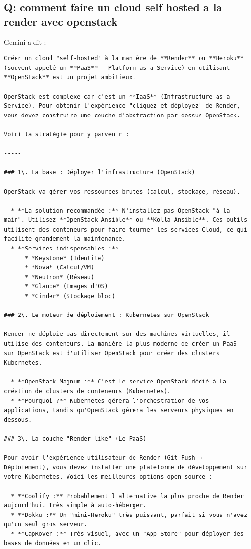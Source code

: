 \documentclass{report} %
\begin{document}
\subsection{Q: comment faire un cloud self hosted a la render avec openstack}
Gemini a dit :
\begin{verbatim}
Créer un cloud "self-hosted" à la manière de **Render** ou **Heroku** (souvent appelé un **PaaS** - Platform as a Service) en utilisant **OpenStack** est un projet ambitieux.

OpenStack est complexe car c'est un **IaaS** (Infrastructure as a Service). Pour obtenir l'expérience "cliquez et déployez" de Render, vous devez construire une couche d'abstraction par-dessus OpenStack.

Voici la stratégie pour y parvenir :

-----

### 1\. La base : Déployer l'infrastructure (OpenStack)

OpenStack va gérer vos ressources brutes (calcul, stockage, réseau).

  * **La solution recommandée :** N'installez pas OpenStack "à la main". Utilisez **OpenStack-Ansible** ou **Kolla-Ansible**. Ces outils utilisent des conteneurs pour faire tourner les services Cloud, ce qui facilite grandement la maintenance.
  * **Services indispensables :**
      * *Keystone* (Identité)
      * *Nova* (Calcul/VM)
      * *Neutron* (Réseau)
      * *Glance* (Images d'OS)
      * *Cinder* (Stockage bloc)

### 2\. Le moteur de déploiement : Kubernetes sur OpenStack

Render ne déploie pas directement sur des machines virtuelles, il utilise des conteneurs. La manière la plus moderne de créer un PaaS sur OpenStack est d'utiliser OpenStack pour créer des clusters Kubernetes.

  * **OpenStack Magnum :** C'est le service OpenStack dédié à la création de clusters de conteneurs (Kubernetes).
  * **Pourquoi ?** Kubernetes gérera l'orchestration de vos applications, tandis qu'OpenStack gérera les serveurs physiques en dessous.

### 3\. La couche "Render-like" (Le PaaS)

Pour avoir l'expérience utilisateur de Render (Git Push → Déploiement), vous devez installer une plateforme de développement sur votre Kubernetes. Voici les meilleures options open-source :

  * **Coolify :** Probablement l'alternative la plus proche de Render aujourd'hui. Très simple à auto-héberger.
  * **Dokku :** Un "mini-Heroku" très puissant, parfait si vous n'avez qu'un seul gros serveur.
  * **CapRover :** Très visuel, avec un "App Store" pour déployer des bases de données en un clic.


\end{verbatim}
\end{document}
